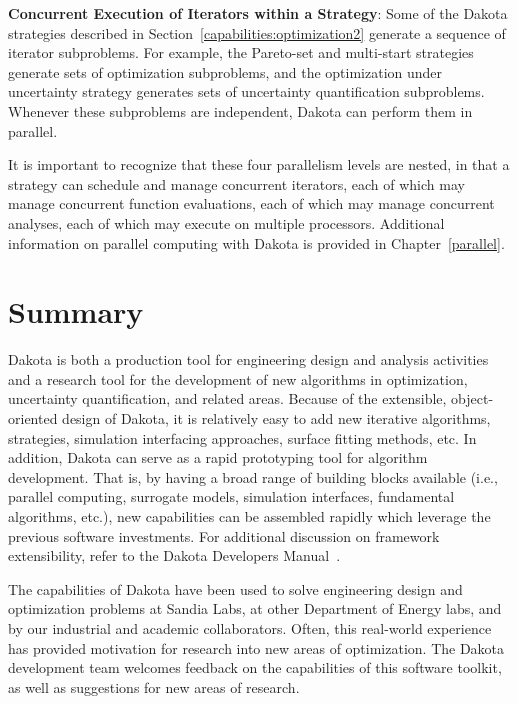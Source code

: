 \textbf{Concurrent Execution of Iterators within a Strategy}: Some of
the Dakota strategies described in
Section~\ref{capabilities:optimization2} generate a sequence of
iterator subproblems. For example, the Pareto-set and
multi-start strategies generate sets of optimization subproblems, and
the optimization under uncertainty strategy generates sets of
uncertainty quantification subproblems. Whenever these subproblems are
independent, Dakota can perform them in parallel.

It is important to recognize that these four parallelism levels are
nested, in that a strategy can schedule and manage concurrent
iterators, each of which may manage concurrent function evaluations,
each of which may manage concurrent analyses, each of which may
execute on multiple processors. Additional information on parallel
computing with Dakota is provided in Chapter~\ref{parallel}.

\section{Summary}\label{capabilities:summary}

Dakota is both a production tool for engineering design and analysis
activities and a research tool for the development of new algorithms
in optimization, uncertainty quantification, and related areas.
Because of the extensible, object-oriented design of Dakota, it is
relatively easy to add new iterative algorithms, strategies,
simulation interfacing approaches, surface fitting methods, etc. In
addition, Dakota can serve as a rapid prototyping tool for algorithm
development. That is, by having a broad range of building blocks
available (i.e., parallel computing, surrogate models, simulation
interfaces, fundamental algorithms, etc.), new capabilities can be
assembled rapidly which leverage the previous software investments.
For additional discussion on framework extensibility, refer to the
Dakota Developers Manual~\cite{DevMan}.

The capabilities of Dakota have been used to solve engineering design
and optimization problems at Sandia Labs, at other Department of
Energy labs, and by our industrial and academic collaborators. Often,
this real-world experience has provided motivation for research into
new areas of optimization. The Dakota development team welcomes
feedback on the capabilities of this software toolkit, as well as
suggestions for new areas of research.
